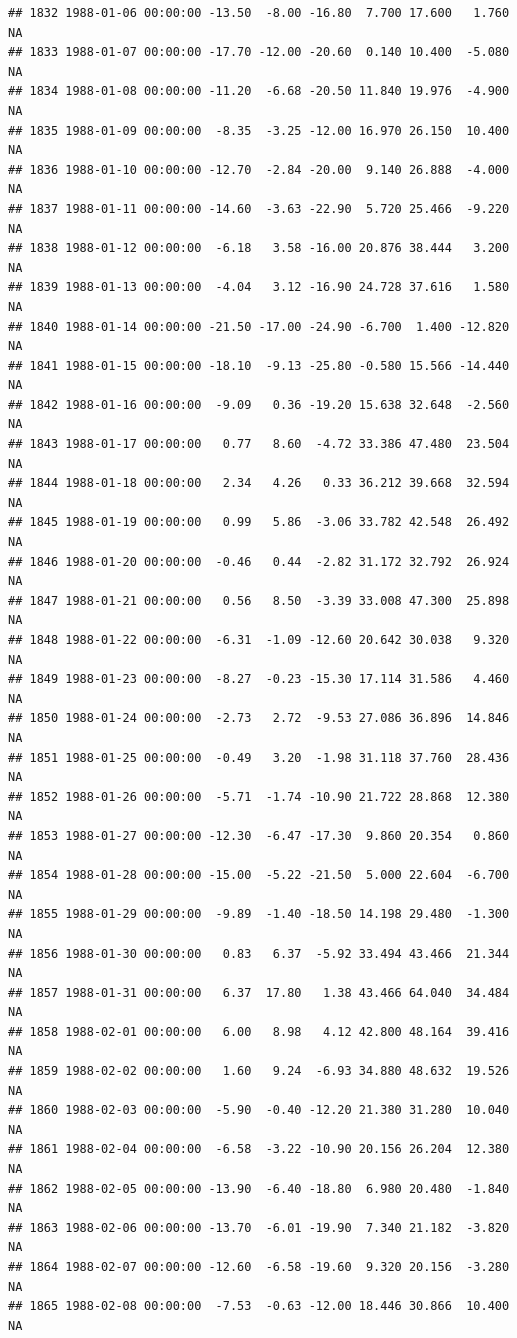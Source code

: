 \documentclass{article}\usepackage{graphicx, color}
\makeatletter
\newenvironment{kframe}{%
 \def\at@end@of@kframe{}%
 \ifinner\ifhmode%
  \def\at@end@of@kframe{\end{minipage}}%
  \begin{minipage}{\columnwidth}%
 \fi\fi%
 \def\FrameCommand##1{\hskip\@totalleftmargin \hskip-\fboxsep
 \colorbox{shadecolor}{##1}\hskip-\fboxsep
     \hskip-\linewidth \hskip-\@totalleftmargin \hskip\columnwidth}%
 \MakeFramed {\advance\hsize-\width
   \@totalleftmargin\z@ \linewidth\hsize
   \@setminipage}}%
 {\par\unskip\endMakeFramed%
 \at@end@of@kframe}
\newenvironment{knitrout}{}{} %
\makeatother
\begin{document}
\begin{knitrout}
\begin{kframe}
\begin{verbatim}
## 1832 1988-01-06 00:00:00 -13.50  -8.00 -16.80  7.700 17.600   1.760     NA
## 1833 1988-01-07 00:00:00 -17.70 -12.00 -20.60  0.140 10.400  -5.080     NA
## 1834 1988-01-08 00:00:00 -11.20  -6.68 -20.50 11.840 19.976  -4.900     NA
## 1835 1988-01-09 00:00:00  -8.35  -3.25 -12.00 16.970 26.150  10.400     NA
## 1836 1988-01-10 00:00:00 -12.70  -2.84 -20.00  9.140 26.888  -4.000     NA
## 1837 1988-01-11 00:00:00 -14.60  -3.63 -22.90  5.720 25.466  -9.220     NA
## 1838 1988-01-12 00:00:00  -6.18   3.58 -16.00 20.876 38.444   3.200     NA
## 1839 1988-01-13 00:00:00  -4.04   3.12 -16.90 24.728 37.616   1.580     NA
## 1840 1988-01-14 00:00:00 -21.50 -17.00 -24.90 -6.700  1.400 -12.820     NA
## 1841 1988-01-15 00:00:00 -18.10  -9.13 -25.80 -0.580 15.566 -14.440     NA
## 1842 1988-01-16 00:00:00  -9.09   0.36 -19.20 15.638 32.648  -2.560     NA
## 1843 1988-01-17 00:00:00   0.77   8.60  -4.72 33.386 47.480  23.504     NA
## 1844 1988-01-18 00:00:00   2.34   4.26   0.33 36.212 39.668  32.594     NA
## 1845 1988-01-19 00:00:00   0.99   5.86  -3.06 33.782 42.548  26.492     NA
## 1846 1988-01-20 00:00:00  -0.46   0.44  -2.82 31.172 32.792  26.924     NA
## 1847 1988-01-21 00:00:00   0.56   8.50  -3.39 33.008 47.300  25.898     NA
## 1848 1988-01-22 00:00:00  -6.31  -1.09 -12.60 20.642 30.038   9.320     NA
## 1849 1988-01-23 00:00:00  -8.27  -0.23 -15.30 17.114 31.586   4.460     NA
## 1850 1988-01-24 00:00:00  -2.73   2.72  -9.53 27.086 36.896  14.846     NA
## 1851 1988-01-25 00:00:00  -0.49   3.20  -1.98 31.118 37.760  28.436     NA
## 1852 1988-01-26 00:00:00  -5.71  -1.74 -10.90 21.722 28.868  12.380     NA
## 1853 1988-01-27 00:00:00 -12.30  -6.47 -17.30  9.860 20.354   0.860     NA
## 1854 1988-01-28 00:00:00 -15.00  -5.22 -21.50  5.000 22.604  -6.700     NA
## 1855 1988-01-29 00:00:00  -9.89  -1.40 -18.50 14.198 29.480  -1.300     NA
## 1856 1988-01-30 00:00:00   0.83   6.37  -5.92 33.494 43.466  21.344     NA
## 1857 1988-01-31 00:00:00   6.37  17.80   1.38 43.466 64.040  34.484     NA
## 1858 1988-02-01 00:00:00   6.00   8.98   4.12 42.800 48.164  39.416     NA
## 1859 1988-02-02 00:00:00   1.60   9.24  -6.93 34.880 48.632  19.526     NA
## 1860 1988-02-03 00:00:00  -5.90  -0.40 -12.20 21.380 31.280  10.040     NA
## 1861 1988-02-04 00:00:00  -6.58  -3.22 -10.90 20.156 26.204  12.380     NA
## 1862 1988-02-05 00:00:00 -13.90  -6.40 -18.80  6.980 20.480  -1.840     NA
## 1863 1988-02-06 00:00:00 -13.70  -6.01 -19.90  7.340 21.182  -3.820     NA
## 1864 1988-02-07 00:00:00 -12.60  -6.58 -19.60  9.320 20.156  -3.280     NA
## 1865 1988-02-08 00:00:00  -7.53  -0.63 -12.00 18.446 30.866  10.400     NA

\end{verbatim}
\end{kframe}
\end{knitrout}
\end{document}
